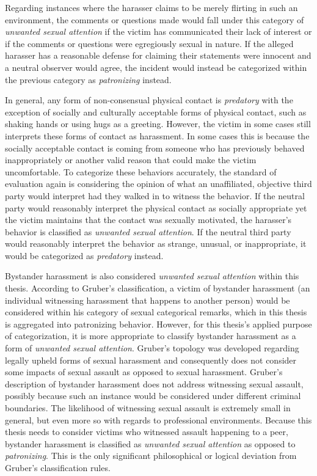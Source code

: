 Regarding instances where the harasser claims to be merely flirting in such an environment, the comments or questions made would fall under this category of  \textit{unwanted sexual attention} if the victim has communicated their lack of interest or if the comments or questions were egregiously sexual in nature. If the alleged harasser has a reasonable defense for claiming their statements were innocent and a neutral observer would agree, the incident would instead be categorized within the previous category as  \textit{patronizing} instead.

In general, any form of non-consensual physical contact is  \textit{predatory} with the exception of socially and culturally acceptable forms of physical contact, such as shaking hands or using hugs as a greeting. However, the victim in some cases still interprets these forms of contact as harassment. In some cases this is because the socially acceptable contact is coming from someone who has previously behaved inappropriately or another valid reason that could make the victim uncomfortable. To categorize these behaviors accurately, the standard of evaluation again is considering the opinion of what an unaffiliated, objective third party would interpret had they walked in to witness the behavior. If the neutral party would reasonably interpret the physical contact as socially appropriate yet the victim maintains that the contact was sexually motivated, the harasser's  behavior is classified as  \textit{unwanted sexual attention}. If the neutral third party would reasonably interpret the behavior as strange, unusual, or inappropriate, it would be categorized as  \textit{predatory} instead.

Bystander harassment is also considered  \textit{unwanted sexual attention} within this thesis. According to Gruber's classification, a victim of bystander harassment (an individual witnessing harassment that happens to another person) would be considered within his category of sexual categorical remarks, which in this thesis is aggregated into patronizing behavior. However, for this thesis's applied purpose of categorization, it is more appropriate to classify bystander harassment as a form of  \textit{unwanted sexual attention}. Gruber's topology was developed regarding legally upheld forms of sexual harassment and consequently does not consider some impacts of sexual assault as opposed to sexual harassment. Gruber's description of bystander harassment does not address witnessing sexual assault, possibly because such an instance would be considered under different criminal boundaries. The likelihood of witnessing sexual assault is extremely small in general, but even more so with regards to professional environments. Because this thesis needs to consider victims who witnessed assault happening to a peer, bystander harassment is classified as  \textit{unwanted sexual attention} as opposed to  \textit{patronizing}. This is the only significant philosophical or logical deviation from Gruber's classification rules.

